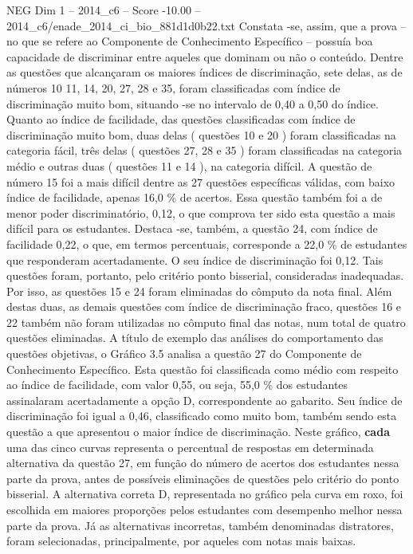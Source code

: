 \begin{textsample}{NEG Dim 1 – 2014\_c6 – Score -10.00 – 2014\_c6/enade\_2014\_ci\_bio\_881d1d0b22.txt}
Constata -se, assim, que a prova – no que se refere ao Componente de Conhecimento Específico – possuía boa capacidade de discriminar entre aqueles que dominam ou não o conteúdo.
Dentre as questões que alcançaram os maiores índices de discriminação, sete delas, as de números 10 11, 14, 20, 27, 28 e 35, foram classificadas com índice de discriminação muito bom, situando -se no intervalo de 0,40 a 0,50 do índice.
Quanto ao índice de facilidade, das questões classificadas com índice de discriminação muito bom, duas delas ( questões 10 e 20 ) foram classificadas na categoria fácil, três delas ( questões 27, 28 e 35 ) foram classificadas na categoria médio e outras duas ( questões 11 e 14 ), na categoria difícil.
A questão de número 15 foi a mais difícil dentre as 27 questões específicas válidas, com baixo índice de facilidade, apenas 16,0 \% de acertos.
Essa questão também foi a de menor poder discriminatório, 0,12, o que comprova ter sido esta questão a mais difícil para os estudantes.
Destaca -se, também, a questão 24, com índice de facilidade 0,22, o que, em termos percentuais, corresponde a 22,0 \% de estudantes que responderam acertadamente.
O seu índice de discriminação foi 0,12.
Tais questões foram, portanto, pelo critério ponto bisserial, consideradas inadequadas.
Por isso, as questões 15 e 24 foram eliminadas do cômputo da nota final.
Além destas duas, as demais questões com índice de discriminação fraco, questões 16 e 22 também não foram utilizadas no cômputo final das notas, num total de quatro questões eliminadas.
A título de exemplo das análises do comportamento das questões objetivas, o Gráfico 3.5 analisa a questão 27 do Componente de Conhecimento Específico.
Esta questão foi classificada como médio com respeito ao índice de facilidade, com valor 0,55, ou seja, 55,0 \% dos estudantes assinalaram acertadamente a opção D, correspondente ao gabarito.
Seu índice de discriminação foi igual a 0,46, classificado como muito bom, também sendo esta questão a que apresentou o maior índice de discriminação.
Neste gráfico, \textbf{cada} uma das cinco curvas representa o percentual de respostas em determinada alternativa da questão 27, em função do número de acertos dos estudantes nessa parte da prova, antes de possíveis eliminações de questões pelo critério do ponto bisserial.
A alternativa correta D, representada no gráfico pela curva em roxo, foi escolhida em maiores proporções pelos estudantes com desempenho melhor nessa parte da prova.
Já as alternativas incorretas, também denominadas distratores, foram selecionadas, principalmente, por aqueles com notas mais baixas.

\end{textsample}
